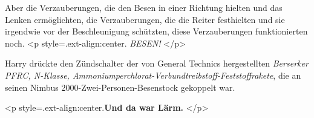 Aber die Verzauberungen, die den Besen in einer Richtung hielten und das Lenken
ermöglichten, die Verzauberungen, die die Reiter festhielten und sie irgendwie
vor der Beschleunigung schützten, diese Verzauberungen funktionierten noch. <p
style=\grqq{}.ext-align:center\grqq{}. \emph{ BESEN! }</p>

Harry drückte den Zündschalter der von General Technics hergestellten
\emph{Berserker PFRC, N-Klasse,
Ammoniumperchlorat-Verbundtreibstoff-Feststoffrakete}, die an seinen Nimbus
2000-Zwei-Personen-Besenstock gekoppelt war.



<p style=\grqq{}.ext-align:center\grqq{}.\textbf{Und da war Lärm. }</p>


